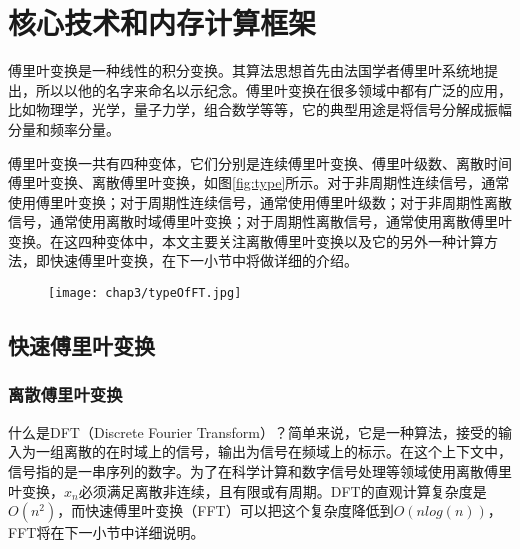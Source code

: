 
\chapter{核心技术和内存计算框架}
\label{chap:FFTandCos}

傅里叶变换是一种线性的积分变换。其算法思想首先由法国学者傅里叶系统地提出，所以以他的名字来命名以示纪念。傅里叶变换在很多领域中都有广泛的应用，比如物理学，光学，量子力学，组合数学等等，它的典型用途是将信号分解成振幅分量和频率分量。

傅里叶变换一共有四种变体，它们分别是连续傅里叶变换、傅里叶级数、离散时间傅里叶变换、离散傅里叶变换，如图\ref{fig:type}所示。对于非周期性连续信号，通常使用傅里叶变换；对于周期性连续信号，通常使用傅里叶级数；对于非周期性离散信号，通常使用离散时域傅里叶变换；对于周期性离散信号，通常使用离散傅里叶变换。在这四种变体中，本文主要关注离散傅里叶变换以及它的另外一种计算方法，即快速傅里叶变换，在下一小节中将做详细的介绍。

\begin{figure}[!h]
\centering
    \begin{minipage}[b]{1\textwidth}
    \captionstyle{\centering}
    \centering
    \texttt{[image: chap3/typeOfFT.jpg]}
    \end{minipage}     
\end{figure}
\section{快速傅里叶变换}
\label{sec:FT}

\subsection{离散傅里叶变换}
\label{sec:DFT}
什么是DFT（Discrete Fourier Transform）？简单来说，它是一种算法，接受的输入为一组离散的在时域上的信号，输出为信号在频域上的标示。在这个上下文中，信号指的是一串序列的数字。为了在科学计算和数字信号处理等领域使用离散傅里叶变换，$x_n$必须满足离散非连续，且有限或有周期。DFT的直观计算复杂度是$O(n^2)$，而快速傅里叶变换（FFT）可以把这个复杂度降低到$O(nlog(n))$，FFT将在下一小节中详细说明。


